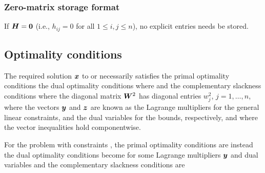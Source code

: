 \documentclass{galahad}
\begin{document}
\subsubsection{Zero-matrix storage format}\label{zero}
If ${\bm{H}} = {\bm{0}}$ (i.e., $h_{ij} = 0$ for all $1 \leq i, j \leq n$),
no explicit entries needs be stored.


\subsection{Optimality conditions\label{galopt}}

The required solution ${\bm{x}}$ to  or 
necessarily satisfies the primal optimality conditions
the dual optimality conditions
where
and the complementary slackness conditions
where the diagonal matrix ${\bm{W}}^{2}$ has diagonal entries $w_{j}^{2}$,
$j = 1, \ldots , n$, where the vectors ${\bm{y}}$ and ${\bm{z}}$ are
known as the Lagrange multipliers for
the general linear constraints, and the dual variables for the bounds,
respectively, and where the vector inequalities hold componentwise.

For the problem  with constraints , the primal
optimality conditions are instead
the dual optimality conditions become
for some Lagrange multipliers ${\bm{y}}$ and dual variables
and the complementary slackness conditions are



\end{document}
